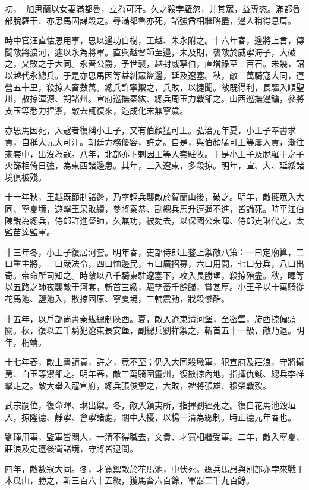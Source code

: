\begin{pinyinscope}
初，加思蘭以女妻滿都魯，立為可汗。久之殺孛羅忽，并其眾，益專恣。滿都魯部脫羅干、亦思馬因謀殺之。尋滿都魯亦死，諸強酋相繼略盡，邊人稍得息肩。

時中官汪直怙恩用事，思以邊功自樹，王越、朱永附之。十六年春，邊將上言，傳聞敵將渡河，遽以永為將軍。直與越督師至邊，未及期，襲敵於威寧海子，大破之，又敗之于大同。永晉公爵，予世襲，越封威寧伯，直增祿至三百石。未幾，詔以越代永總兵。于是亦思馬因等益糾眾盜邊，延及遼塞。秋，敵三萬騎寇大同，連營五十里，殺掠人畜數萬。總兵許寧禦之，兵敗，以捷聞。敵既得利，長驅入順聖川，散掠渾源、朔諸州。宣府巡撫秦紘、總兵周玉力戰卻之。山西巡撫邊鏞，參將支玉等悉力捍禦，敵去輒復來，迄成化末無寧歲。

亦思馬因死，入寇者復稱小王子，又有伯顏猛可王。弘治元年夏，小王子奉書求貢，自稱大元大可汗。朝廷方務優容，許之。自是，與伯顏猛可王等屢入貢，漸往來套中，出沒為寇。八年，北部亦卜剌因王等入套駐牧。于是小王子及脫羅干之子火篩相倚日強，為東西諸邊患。其年，三入遼東，多殺掠。明年，宣、大、延綏諸境俱被殘。

十一年秋，王越既節制諸邊，乃率輕兵襲敵於賀蘭山後，破之。明年，敵擁眾入大同、寧夏境，遊擊王杲敗績，參將秦恭、副總兵馬升逗遛不進，皆論死。時平江伯陳銳為總兵，侍郎許進督師，久無功，被劾去，以保國公朱暉、侍郎史琳代之，太監苗逵監軍。

十三年冬，小王子復居河套。明年春，吏部侍郎王鏊上禦敵八策：一曰定廟算，二曰重主將，三曰嚴法令，四曰恤邊民，五曰廣招募，六曰用間，七曰分兵，八曰出奇。帝命所司知之。時敵以八千騎東駐遼塞下，攻入長勝堡，殺掠殆盡。秋，暉等以五路之師夜襲敵于河套，斬首三級，驅孳畜千餘歸，賞甚厚。小王子以十萬騎從花馬池、鹽池入，散掠固原、寧夏境，三輔震動，戕殺慘酷。

十五年，以戶部尚書秦紘總制陜西。夏，敵入遼東清河堡，至密雲，旋西掠偏頭關。秋，復以五千騎犯遼東長安堡，副總兵劉祥禦之，斬首五十一級，敵乃退。明年，稍靖。

十七年春，敵上書請貢，許之，竟不至；仍入大同殺墩軍，犯宣府及莊浪，守將衛勇、白玉等禦卻之。明年春，敵三萬騎圍靈州，復散掠內地，指揮仇鉞、總兵李祥擊走之。敵大舉入寇宣府，總兵張俊禦之，大敗，裨將張雄、穆榮戰歿。

武宗嗣位，復命暉、琳出禦。冬，敵入鎮夷所，指揮劉經死之。復自花馬池毀垣入，掠隆德、靜寧、會寧諸處，關中大擾，以楊一清為總制。時正德元年春也。

劉瑾用事，監軍皆閹人，一清不得職去，文貴、才寬相繼受事。二年，敵入寧夏、莊浪及定遼後衛諸境，守將皆逮問。

四年，敵數寇大同。冬，才寬禦敵於花馬池，中伏死。總兵馬昂與別部亦孛來戰于木瓜山，勝之，斬三百六十五級，獲馬畜六百餘，軍器二千九百餘。


\end{pinyinscope}
